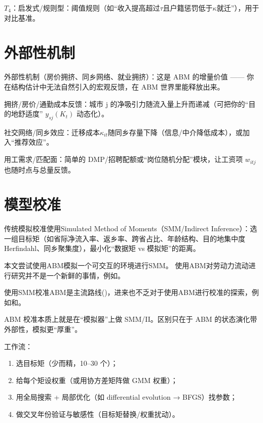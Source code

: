 \documentclass[
  a4paper,
  zihao=-4,
  fontset=mac,
  AutoFakeBold,
  AutoFakeSlant,
  oneside]{ctexbook}
\begin{document}
$T_4$：启发式/规则型：阈值规则（如“收入提高超过$\tau$且户籍惩罚低于$\kappa$就迁”），用于对比基准。




\section{外部性机制} %
\label{sec:外部性机制}

外部性机制（房价拥挤、同乡网络、就业拥挤）：这是 ABM 的增量价值 —— 你在结构估计中无法自然引入的宏观反馈，在 ABM 世界里能释放出来。

拥挤/房价/通勤成本反馈：城市 j 的净吸引力随流入量上升而递减（可把你的“目的地舒适度” $y_{sj}(K_t)$ 动态化）。

社交网络/同乡效应：迁移成本$\kappa_{it}$随同乡存量下降（信息/中介降低成本），或加入“推荐效应”。

用工需求/匹配面：简单的 DMP/招聘配额或“岗位随机分配”模块，让工资项 $w_{itj}$ 也随时点与总量反馈。



\section{模型校准} %
\label{sub:模型校准}


传统模拟校准使用Simulated Method of Moments（SMM/Indirect Inference）：选一组目标矩（如省际净流入率、返乡率、跨省占比、年龄结构、目的地集中度 Herfindahl、同乡聚集度），最小化“数据矩 vs 模拟矩”的距离。

本文尝试使用ABM模拟一个可交互的环境进行SMM。
使用ABM对劳动力流动进行研究并不是一个新鲜的事情，例如\textcite{fuAgentBasedModelingChinas2018,klabundeDecisionmakingAgentbasedModels2016}。

使用SMM校准ABM是主流路线(\textcite{plattComparisonEconomicAgentbased2020})，进来也不乏对于使用ABM进行校准的探索，例如\textcite{rahmandadUsingMethodSimulated2015}和\textcite{pietzschMetamodelsEvaluatingCalibrating2020}。

ABM 校准本质上就是在“模拟器”上做 SMM/II。区别只在于 ABM 的状态演化带外部性，模拟更“厚重”。

工作流：
\begin{enumerate}
\item 选目标矩（少而精，10–30 个）；
\item 给每个矩设权重（或用协方差矩阵做 GMM 权重）；
\item 用全局搜索 + 局部优化（如 differential evolution → BFGS）找参数；
\item 做交叉年份验证与敏感性（目标矩替换/权重扰动）。
\end{enumerate}
\end{document}
